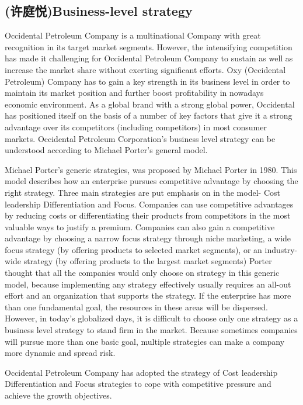 \documentclass[
	a4paper, %
	12pt,%
]{CSSullivanBusinessReport}
\begin{document}
\begin{fullwidth}
\section{(许庭悦)Business-level strategy}
Occidental Petroleum Company is a multinational Company with great recognition in its target market segments. However, the intensifying competition has made it challenging for Occidental Petroleum Company to sustain as well as increase the market share without exerting significant efforts. Oxy (Occidental Petroleum) Company has to gain a key strength in its business level in order to maintain its market position and further boost profitability in nowadays economic environment. As a global brand with a strong global power, Occidental has positioned itself on the basis of a number of key factors that give it a strong advantage over its competitors (including competitors) in most consumer markets. Occidental Petroleum Corporation's business level strategy can be understood according to Michael Porter's general model. \par
Michael Porter’s generic strategies, was proposed by Michael Porter in 1980. This model describes how an enterprise pursues competitive advantage by choosing the right strategy. Three main strategies are put emphasis on in the model- Cost leadership Differentiation and Focus. Companies can use competitive advantages by reducing costs or differentiating their products from competitors in the most valuable ways to justify a premium. Companies can also gain a competitive advantage by choosing a narrow focus strategy through niche marketing, a wide focus strategy (by offering products to selected market segments), or an industry-wide strategy (by offering products to the largest market segments) Porter thought that all the companies would only choose on strategy in this generic model, because implementing any strategy effectively usually requires an all-out effort and an organization that supports the strategy. If the enterprise has more than one fundamental goal, the resources in these areas will be dispersed. However, in today's globalized days, it is difficult to choose only one strategy as a business level strategy to stand firm in the market. Because sometimes companies will pursue more than one basic goal, multiple strategies can make a company more dynamic and spread risk.
\par
Occidental Petroleum Company has adopted the strategy of Cost leadership Differentiation and Focus strategies to cope with competitive pressure and achieve the growth objectives.

\end{fullwidth}
\end{document}
